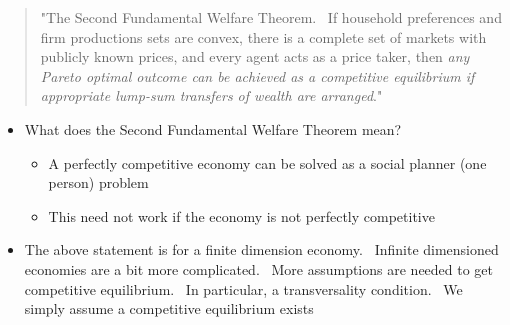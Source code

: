 \documentclass[notes=show]{beamer}
\begin{document}
\begin{frame}%


\begin{quotation}
"The Second Fundamental Welfare Theorem. \ If household preferences and firm
productions sets are convex, there is a complete set of markets with
publicly known prices, and every agent acts as a price taker, then \textit{%
any Pareto optimal outcome can be achieved as a competitive equilibrium if
appropriate lump-sum transfers of wealth are arranged}."
\end{quotation}

\begin{itemize}
\item What does the Second Fundamental Welfare Theorem mean?

\begin{itemize}
\item A perfectly competitive economy can be solved as a social planner (one
person) problem

\item This need not work if the economy is not perfectly competitive
\end{itemize}

\item The above statement is for a finite dimension economy. \ Infinite
dimensioned economies are a bit more complicated. \ More assumptions are
needed to get competitive equilibrium. \ In particular, a transversality
condition. \ We simply assume a competitive equilibrium exists
\end{itemize}

\end{frame}%
\end{document}
